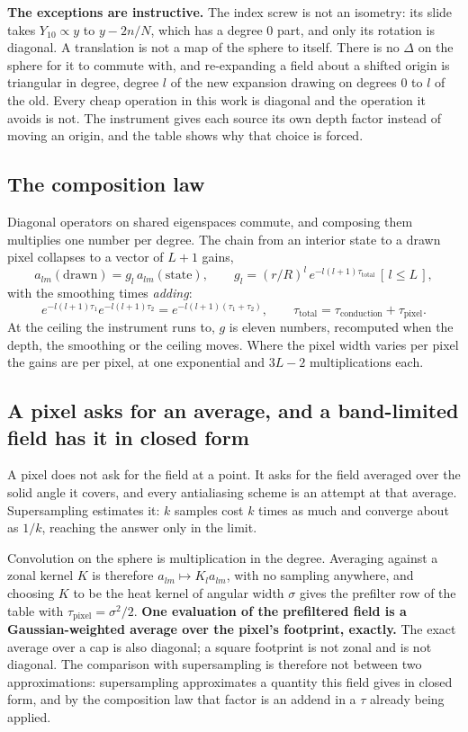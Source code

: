 \textbf{The exceptions are instructive.} The index screw is not an isometry: its slide takes \(Y_{10} \propto y\) to \(y - 2n/N\), which has a degree \(0\) part, and only its rotation is diagonal. A translation is not a map of the sphere to itself. There is no \(\Delta\) on the sphere for it to commute with, and re-expanding a field about a shifted origin is triangular in degree, degree \(l\) of the new expansion drawing on degrees \(0\) to \(l\) of the old. Every cheap operation in this work is diagonal and the operation it avoids is not. The instrument gives each source its own depth factor instead of moving an origin, and the table shows why that choice is forced.

\subsection{The composition law}

Diagonal operators on shared eigenspaces commute, and composing them multiplies one number per degree. The chain from an interior state to a drawn pixel collapses to a vector of \(L+1\) gains,
\[
  a_{lm}(\text{drawn}) = g_l \, a_{lm}(\text{state}),
  \qquad
  g_l = (r/R)^{l}\, e^{-l(l+1)\tau_{\mathrm{total}}}\, [\,l \le L\,],
\]
with the smoothing times \emph{adding}:
\[
  e^{-l(l+1)\tau_1} e^{-l(l+1)\tau_2} = e^{-l(l+1)(\tau_1 + \tau_2)},
  \qquad
  \tau_{\mathrm{total}} = \tau_{\mathrm{conduction}} + \tau_{\mathrm{pixel}}.
\]
At the ceiling the instrument runs to, \(g\) is eleven numbers, recomputed when the depth, the smoothing or the ceiling moves. Where the pixel width varies per pixel the gains are per pixel, at one exponential and \(3L - 2\) multiplications each.

\subsection{A pixel asks for an average, and a band-limited field has it in closed form}

A pixel does not ask for the field at a point. It asks for the field averaged over the solid angle it covers, and every antialiasing scheme is an attempt at that average. Supersampling estimates it: \(k\) samples cost \(k\) times as much and converge about as \(1/k\), reaching the answer only in the limit.

Convolution on the sphere is multiplication in the degree. Averaging against a zonal kernel \(K\) is therefore \(a_{lm} \mapsto K_l a_{lm}\), with no sampling anywhere, and choosing \(K\) to be the heat kernel of angular width \(\sigma\) gives the prefilter row of the table with \(\tau_{\mathrm{pixel}} = \sigma^2/2\). \textbf{One evaluation of the prefiltered field is a Gaussian-weighted average over the pixel's footprint, exactly.} The exact average over a cap is also diagonal; a square footprint is not zonal and is not diagonal. The comparison with supersampling is therefore not between two approximations: supersampling approximates a quantity this field gives in closed form, and by the composition law that factor is an addend in a \(\tau\) already being applied.

